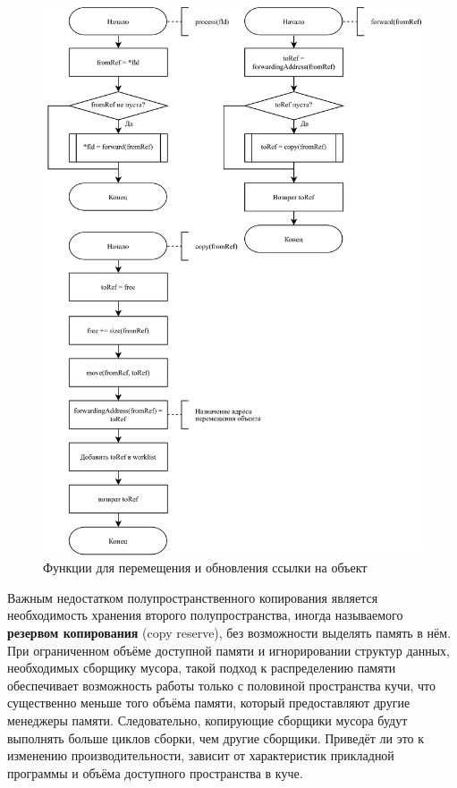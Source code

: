 \begin{figure}[H]
	\centering
	\includegraphics[scale=0.175]{assets/copying-3.png}
	\caption{Функции для перемещения и обновления ссылки на объект}
	\label{fig:copying-3}
\end{figure}

Важным недостатком полупространственного копирования является необходимость хранения второго полупространства, иногда называемого \textbf{резервом копирования} (copy reserve), без возможности выделять память в нём. При ограниченном объёме доступной памяти и игнорировании структур данных, необходимых сборщику мусора, такой подход к распределению памяти обеспечивает возможность работы только с половиной пространства кучи, что существенно меньше того объёма памяти, который предоставляют другие менеджеры памяти. Следовательно, копирующие сборщики мусора будут выполнять больше циклов сборки, чем другие сборщики. Приведёт ли это к изменению производительности, зависит от характеристик прикладной программы и объёма доступного пространства в куче. \cite{handbook}

